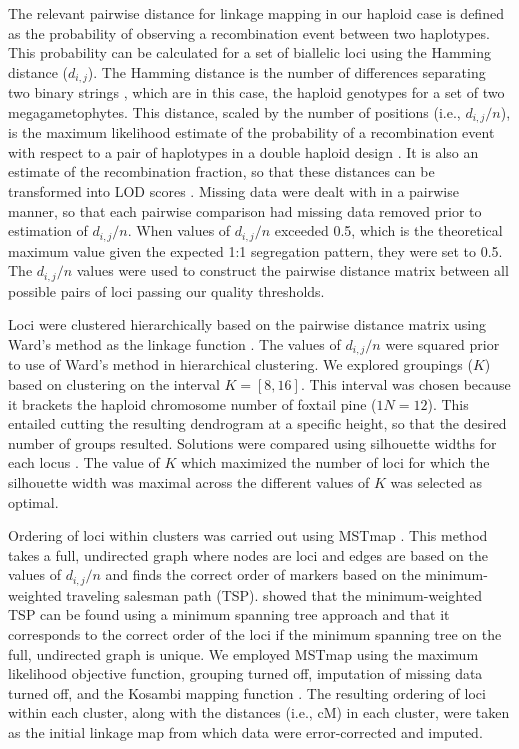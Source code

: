 \documentclass[11pt]{article}
\begin{document}
The relevant pairwise distance for linkage mapping in our haploid case is defined as the probability 
of observing a recombination event between two haplotypes. This probability can be calculated for a set of 
biallelic loci using the Hamming distance ($d_{i,j}$).
The Hamming distance is the number of differences separating two binary strings \citep{Hamming:1950}, which are 
in this case, the haploid genotypes for a set of two megagametophytes. 
This distance, scaled by the number of positions (i.e., $d_{i,j}/n$), 
is the maximum likelihood estimate of the probability of a recombination event with respect to a pair of haplotypes 
in a double haploid design \citep{Wu:2008a}. It is also an estimate of the recombination fraction, so that these distances can be transformed into LOD 
scores \citep[see][]{Morton:1955}. Missing data were dealt with in a pairwise manner, so that each pairwise comparison had 
missing data removed prior to estimation of $d_{i,j}/n$. When values of $d_{i,j}/n$ exceeded 0.5, which is the theoretical maximum 
value given the expected 1:1 segregation pattern, they were set to 0.5.  The $d_{i,j}/n$ values were used to construct the 
pairwise distance matrix between all possible pairs of loci passing our quality thresholds.

Loci were clustered hierarchically based on the pairwise distance matrix using Ward's method as the linkage function \citep{Ward:1963}.
The values of $d_{i,j}/n$ were squared prior to use of Ward's method in hierarchical clustering.
We explored groupings ($K$) based on clustering on the interval $K=[8,16]$. This interval was 
chosen because it brackets the haploid chromosome number of foxtail pine ($1N = 12$). This entailed 
cutting the resulting dendrogram at a specific height, so that the desired number of groups resulted. 
Solutions were compared using silhouette widths for each locus \citep{Rousseeuw:1987}. 
The value of $K$ which maximized the number of loci for which the silhouette width was maximal 
across the different values of $K$ was selected as optimal.

Ordering of loci within clusters was carried out using MSTmap \citep{Wu:2008a}. This method takes a full, undirected graph where 
nodes are loci and edges are based on the values of $d_{i,j}/n$ and finds the correct order of markers based on the minimum-weighted 
traveling salesman path (TSP). \citet{Wu:2008a} showed that the minimum-weighted TSP can be found using a minimum spanning tree approach 
and that it corresponds to the correct order of the loci if the minimum spanning tree on the full, undirected graph is unique. We 
employed MSTmap using the maximum likelihood objective function, grouping turned off, imputation of missing data turned off, and the 
Kosambi mapping function \citep{Kosambi:1944}. The resulting ordering of loci within each cluster, along with the distances (i.e., cM) 
in each cluster, were taken as the initial linkage map from which data were error-corrected and imputed.
\end{document}
